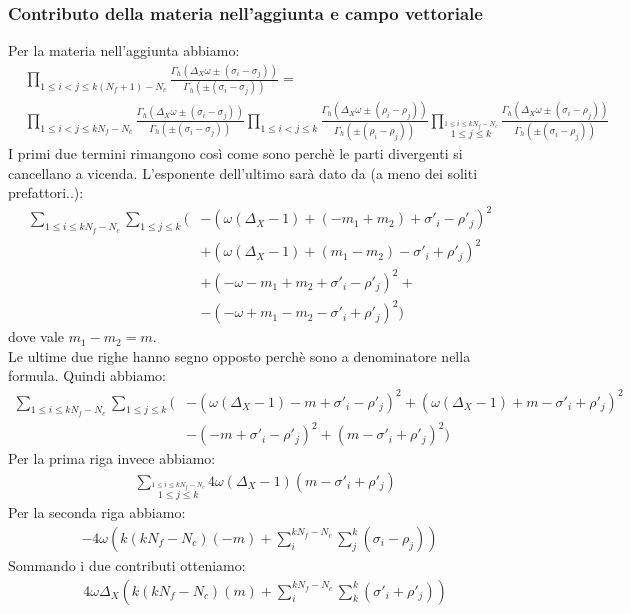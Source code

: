\documentclass[a4paper,12pt]{article}
\begin{document}
\subsubsection{Contributo della materia nell'aggiunta e campo vettoriale }
Per la materia nell'aggiunta abbiamo:
\begin{align*}
& \prod_{ 1 \leq i<j \leq k(N_f+1)- N_c } \frac{ \Gamma_h( \Delta_X \omega \pm (\sigma_i - \sigma_j)) }{ \Gamma_h ( \pm (\sigma_i - \sigma_j) )} = \\
& \prod_{ 1 \leq i<j \leq kN_f- N_c } \frac{ \Gamma_h( \Delta_X \omega \pm (\sigma_i - \sigma_j)) }{ \Gamma_h ( \pm (\sigma_i - \sigma_j) )}
 \prod_{ 1 \leq i<j \leq k } \frac{ \Gamma_h( \Delta_X \omega \pm (\rho_i - \rho_j)) }{ \Gamma_h ( \pm (\rho_i - \rho_j) )}
 \prod_{ \overset{1 \leq i \leq kN_f- N_c }{ 1 \leq j \leq k }} \frac{ \Gamma_h( \Delta_X \omega \pm (\sigma_i - \rho_j)) }{ \Gamma_h ( \pm (\sigma_i - \rho_j) )}
\end{align*}
I primi due termini rimangono così come sono perchè le parti divergenti si cancellano a vicenda.
L'esponente dell'ultimo sarà dato da (a meno dei soliti prefattori..):
\begin{align*}
\sum_{1 \leq i \leq kN_f- N_c } \sum_{ 1 \leq j \leq k }  \bigg( &  - \left( \omega( \Delta_X -1) + ( -m_1 + m_2)  + \sigma'_i - \rho'_j \right)^2 \\
& + \left(  \omega( \Delta_X -1) + ( m_1 - m_2)  - \sigma'_i + \rho'_j\right)^2 \\
& + \left( -\omega  - m_1 + m_2  + \sigma'_i - \rho'_j \right)^2 + \\
& - \left( -\omega +  m_1 - m_2  - \sigma'_i + \rho'_j\right)^2
\bigg)
\end{align*}
dove vale $ m_1 - m_2 = m$.\\
Le ultime due righe hanno segno opposto perchè sono a denominatore nella formula.
Quindi abbiamo:
\begin{align*}
\sum_{1 \leq i \leq kN_f- N_c } \sum_{ 1 \leq j \leq k }  \bigg( &  - \left( \omega( \Delta_X -1) -m  + \sigma'_i - \rho'_j \right)^2  + \left(  \omega( \Delta_X -1) + m  - \sigma'_i + \rho'_j\right)^2 \\
& -\left(  -m  + \sigma'_i - \rho'_j \right)^2  + \left( m - \sigma'_i + \rho'_j\right)^2
\bigg)
\end{align*}
Per la prima riga invece abbiamo:
\begin{align*}
& \sum_{ \overset{1 \leq i \leq kN_f- N_c }{ 1 \leq j \leq k }} 4 \omega ( \Delta_X -1) ( m - \sigma'_i + \rho'_j)
\end{align*}
Per la seconda riga abbiamo:
\begin{align*}
- 4 \omega \left( k ( k N_f - N_c )  ( - m ) + \sum_i^{k N_f - N_c} \sum_j^{k} ( \sigma_i - \rho_j) \right)
\end{align*}
Sommando i due contributi otteniamo:
\begin{align*}
&  4 \omega \Delta_X \left( k ( k N_f - N_c)   (m ) + \sum_i^{k N_f -N_c} \sum_k^{k }  ( \sigma'_i + \rho'_j)\right)
\end{align*}
\end{document}
